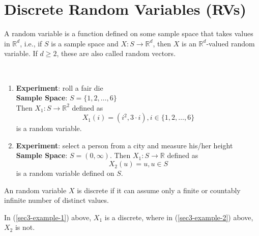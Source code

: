 \section{Discrete Random Variables (RVs)}
\begin{definition}
    A random variable is a function defined on some sample space that takes
values in $\mathbb{R}^d$, i.e., if $S$ is a sample space and $X : S
\rightarrow \mathbb{R}^d$, then $X$ is an $\mathbb{R}^d$-valued random
variable. If $d \geq 2$, these are also called random vectors.
\end{definition}

\begin{example} \quad                                                        \\
\begin{enumerate}[noitemsep, topsep=0em]
    \item \label{sec3-example-1}
          \textbf{Experiment}: roll a fair die                               \\
          \textbf{Sample Space}: $S = \lbrace 1, 2, \dots, 6 \rbrace$        \\
          Then $X_1 : S \rightarrow \mathbb{R}^2$ defined as
          \begin{equation*}
              X_1(i) = (i^2, 3 \cdot i), i \in \lbrace 1, 2, \dots, 6 \rbrace
          \end{equation*}
          is a random variable.
    \item \label{sec3-example-2}
          \textbf{Experiment}: select a person from a city and measure his/her
          height                                                             \\
          \textbf{Sample Space}: $S = (0, \infty)$. 
          Then $X_1 : S \rightarrow \mathbb{R}$ defined as
          \begin{equation*}
              X_2(u) = u, u \in S
          \end{equation*}
          is a random variable defined on $S$.
\end{enumerate}
\end{example}

\begin{definition}
    An random variable $X$ is discrete if it can assume only a finite or
countably infinite number of distinct values.
\end{definition}

\begin{example}
    In (\ref{sec3-example-1}) above, $X_1$ is a discrete, where in
(\ref{sec3-example-2}) above, $X_2$ is not.
\end{example}

